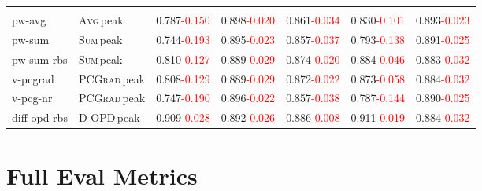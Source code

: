 \documentclass[11pt]{article}
\begin{document}
\begin{table}[ht]
{\begin{tabular}{@{}ll|cc|c|cc@{}}
\addlinespace
\multicolumn{7}{@{}l}{\textit{OPD training (running, peak eval)}} \\
pw-avg & \textsc{Avg}{\footnotesize\,peak} & \cellcolor{gray!20}0.787{\footnotesize\textcolor{red}{-0.150}} & 0.898{\footnotesize\textcolor{red}{-0.020}} & \cellcolor{gray!20}0.861{\footnotesize\textcolor{red}{-0.034}} & \cellcolor{gray!20}0.830{\footnotesize\textcolor{red}{-0.101}} & 0.893{\footnotesize\textcolor{red}{-0.023}} \\
pw-sum & \textsc{Sum}{\footnotesize\,peak} & \cellcolor{gray!20}0.744{\footnotesize\textcolor{red}{-0.193}} & 0.895{\footnotesize\textcolor{red}{-0.023}} & \cellcolor{gray!20}0.857{\footnotesize\textcolor{red}{-0.037}} & \cellcolor{gray!20}0.793{\footnotesize\textcolor{red}{-0.138}} & 0.891{\footnotesize\textcolor{red}{-0.025}} \\
pw-sum-rbs & \textsc{Sum}{\footnotesize\,peak} & \cellcolor{gray!20}0.810{\footnotesize\textcolor{red}{-0.127}} & 0.889{\footnotesize\textcolor{red}{-0.029}} & \cellcolor{gray!20}0.874{\footnotesize\textcolor{red}{-0.020}} & \cellcolor{gray!20}0.884{\footnotesize\textcolor{red}{-0.046}} & 0.883{\footnotesize\textcolor{red}{-0.032}} \\
v-pcgrad & \textsc{PCGrad}{\footnotesize\,peak} & \cellcolor{gray!20}0.808{\footnotesize\textcolor{red}{-0.129}} & 0.889{\footnotesize\textcolor{red}{-0.029}} & \cellcolor{gray!20}0.872{\footnotesize\textcolor{red}{-0.022}} & \cellcolor{gray!20}0.873{\footnotesize\textcolor{red}{-0.058}} & 0.884{\footnotesize\textcolor{red}{-0.032}} \\
v-pcg-nr & \textsc{PCGrad}{\footnotesize\,peak} & \cellcolor{gray!20}0.747{\footnotesize\textcolor{red}{-0.190}} & 0.896{\footnotesize\textcolor{red}{-0.022}} & \cellcolor{gray!20}0.857{\footnotesize\textcolor{red}{-0.038}} & \cellcolor{gray!20}0.787{\footnotesize\textcolor{red}{-0.144}} & 0.890{\footnotesize\textcolor{red}{-0.025}} \\
diff-opd-rbs & \textsc{D-OPD}{\footnotesize\,peak} & \cellcolor{gray!20}0.909{\footnotesize\textcolor{red}{-0.028}} & 0.892{\footnotesize\textcolor{red}{-0.026}} & \cellcolor{gray!20}0.886{\footnotesize\textcolor{red}{-0.008}} & \cellcolor{gray!20}0.911{\footnotesize\textcolor{red}{-0.019}} & 0.884{\footnotesize\textcolor{red}{-0.032}} \\
\bottomrule
\end{tabular}
}
\end{table}

\section{Full Eval Metrics}
\end{document}
